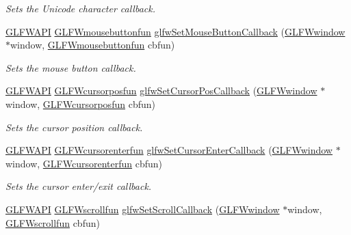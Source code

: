 \begin{DoxyCompactItemize}
\begin{DoxyCompactList}\small\item\em Sets the Unicode character callback. \end{DoxyCompactList}\item 
\hyperlink{glfw3_8h_a56da5036b2cc259351ae22fd6439bb47}{G\-L\-F\-W\-A\-P\-I} \hyperlink{group__input_ga1e008c7a8751cea648c8f42cc91104cf}{G\-L\-F\-Wmousebuttonfun} \hyperlink{group__input_ga20e5ba1ce4e086aedd48a06dc311c95f}{glfw\-Set\-Mouse\-Button\-Callback} (\hyperlink{group__window_ga3c96d80d363e67d13a41b5d1821f3242}{G\-L\-F\-Wwindow} $\ast$window, \hyperlink{group__input_ga1e008c7a8751cea648c8f42cc91104cf}{G\-L\-F\-Wmousebuttonfun} cbfun)
\begin{DoxyCompactList}\small\item\em Sets the mouse button callback. \end{DoxyCompactList}\item 
\hyperlink{glfw3_8h_a56da5036b2cc259351ae22fd6439bb47}{G\-L\-F\-W\-A\-P\-I} \hyperlink{group__input_ga592fbfef76d88f027cb1bc4c36ebd437}{G\-L\-F\-Wcursorposfun} \hyperlink{group__input_ga9c49c0d3d3c775c3124726f1d902124d}{glfw\-Set\-Cursor\-Pos\-Callback} (\hyperlink{group__window_ga3c96d80d363e67d13a41b5d1821f3242}{G\-L\-F\-Wwindow} $\ast$window, \hyperlink{group__input_ga592fbfef76d88f027cb1bc4c36ebd437}{G\-L\-F\-Wcursorposfun} cbfun)
\begin{DoxyCompactList}\small\item\em Sets the cursor position callback. \end{DoxyCompactList}\item 
\hyperlink{glfw3_8h_a56da5036b2cc259351ae22fd6439bb47}{G\-L\-F\-W\-A\-P\-I} \hyperlink{group__input_ga762d898d9b0241d7e3e3b767c6cf318f}{G\-L\-F\-Wcursorenterfun} \hyperlink{group__input_gaa20014985561efeb2c53f1956f727830}{glfw\-Set\-Cursor\-Enter\-Callback} (\hyperlink{group__window_ga3c96d80d363e67d13a41b5d1821f3242}{G\-L\-F\-Wwindow} $\ast$window, \hyperlink{group__input_ga762d898d9b0241d7e3e3b767c6cf318f}{G\-L\-F\-Wcursorenterfun} cbfun)
\begin{DoxyCompactList}\small\item\em Sets the cursor enter/exit callback. \end{DoxyCompactList}\item 
\hyperlink{glfw3_8h_a56da5036b2cc259351ae22fd6439bb47}{G\-L\-F\-W\-A\-P\-I} \hyperlink{group__input_ga6228cdf94d28fbd3a9a1fbb0e5922a8a}{G\-L\-F\-Wscrollfun} \hyperlink{group__input_ga29011514e93368712a3063a28707ced3}{glfw\-Set\-Scroll\-Callback} (\hyperlink{group__window_ga3c96d80d363e67d13a41b5d1821f3242}{G\-L\-F\-Wwindow} $\ast$window, \hyperlink{group__input_ga6228cdf94d28fbd3a9a1fbb0e5922a8a}{G\-L\-F\-Wscrollfun} cbfun)

\end{DoxyCompactItemize}
